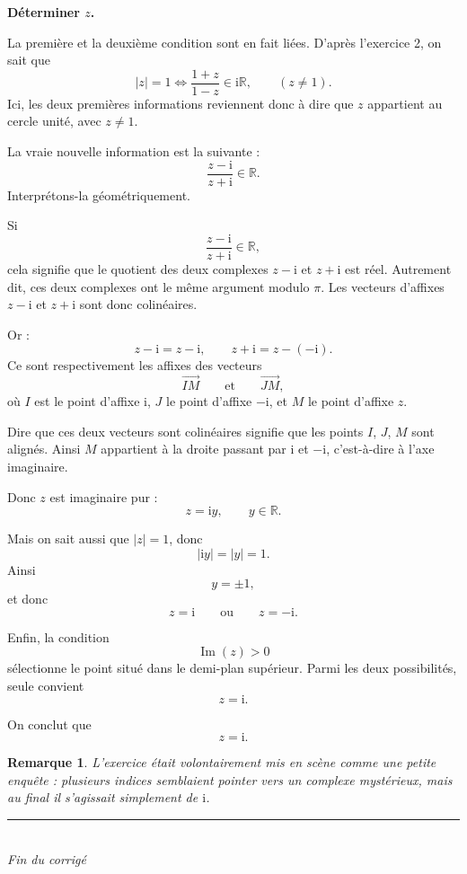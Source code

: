 \documentclass[11pt,a4paper]{article}
\newtheorem*{remarque}{Remarque}
\newcommand{\R}{\mathbb{R}}
\newcommand{\ii}{\mathrm{i}}
\newcommand{\im}{\operatorname{Im}}
\begin{document}
\textbf{Déterminer \(z\).}

\bigskip

La première et la deuxième condition sont en fait liées. D’après l’exercice 2, on sait que
\[
|z|=1
\Longleftrightarrow
\frac{1+z}{1-z}\in\ii\R,
\qquad (z\neq 1).
\]
Ici, les deux premières informations reviennent donc à dire que \(z\) appartient au cercle unité, avec \(z\neq 1\).

La vraie nouvelle information est la suivante :
\[
\frac{z-\ii}{z+\ii}\in\R.
\]
Interprétons-la géométriquement.

\medskip

Si
\[
\frac{z-\ii}{z+\ii}\in\R,
\]
cela signifie que le quotient des deux complexes \(z-\ii\) et \(z+\ii\) est réel. Autrement dit, ces deux complexes ont le même argument modulo \(\pi\). Les vecteurs d’affixes \(z-\ii\) et \(z+\ii\) sont donc colinéaires.

Or :
\[
z-\ii = z-\ii,
\qquad
z+\ii = z-(-\ii).
\]
Ce sont respectivement les affixes des vecteurs
\[
\overrightarrow{I M}
\qquad\text{et}\qquad
\overrightarrow{J M},
\]
où \(I\) est le point d’affixe \(\ii\), \(J\) le point d’affixe \(-\ii\), et \(M\) le point d’affixe \(z\).

Dire que ces deux vecteurs sont colinéaires signifie que les points \(I\), \(J\), \(M\) sont alignés. Ainsi \(M\) appartient à la droite passant par \(\ii\) et \(-\ii\), c’est-à-dire à l’axe imaginaire.

Donc \(z\) est imaginaire pur :
\[
z=\ii y,\qquad y\in\R.
\]

Mais on sait aussi que \(|z|=1\), donc
\[
|\ii y|=|y|=1.
\]
Ainsi
\[
y=\pm 1,
\]
et donc
\[
z=\ii
\qquad\text{ou}\qquad
z=-\ii.
\]

Enfin, la condition
\[
\im(z)>0
\]
sélectionne le point situé dans le demi-plan supérieur. Parmi les deux possibilités, seule convient
\[
z=\ii.
\]

On conclut que
\[
\boxed{z=\ii.}
\]

\begin{remarque}
L’exercice était volontairement mis en scène comme une petite enquête : plusieurs indices semblaient pointer vers un complexe mystérieux, mais au final il s’agissait simplement de \( \ii \).
\end{remarque}

\vfill

\begin{center}
    \rule{0.9\linewidth}{0.6pt}\\[0.4em]
    \textit{Fin du corrigé}
\end{center}
\end{document}
